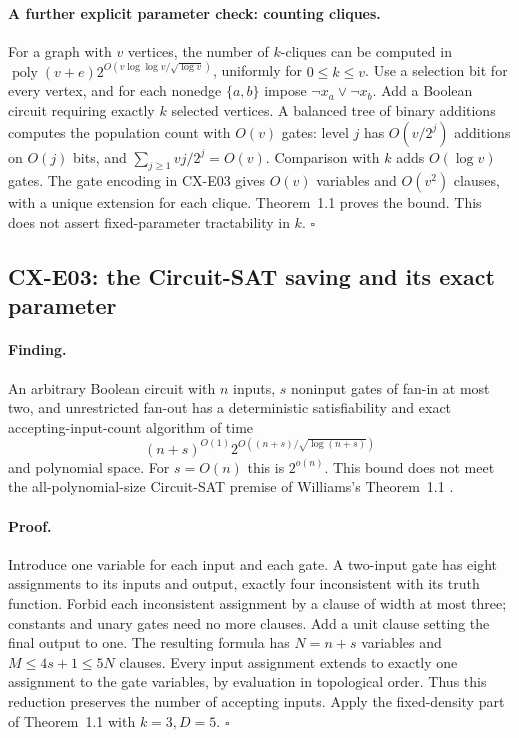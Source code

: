 \paragraph{A further explicit parameter check: counting cliques.}
For a graph with \(v\) vertices, the number of \(k\)-cliques can be
computed in
\(\operatorname{poly}(v+e)
 2^{O(v\log\log v/\sqrt{\log v})}\),
uniformly for \(0\leq k\leq v\).
Use a selection bit for every vertex, and for each nonedge
\(\{a,b\}\) impose \(\neg x_a\vee\neg x_b\).
Add a Boolean circuit requiring exactly \(k\) selected vertices.
A balanced tree of binary additions computes the population count
with \(O(v)\) gates: level \(j\) has \(O(v/2^j)\) additions on
\(O(j)\) bits, and
\(\sum_{j\geq1}vj/2^j=O(v)\).
Comparison with \(k\) adds \(O(\log v)\) gates.
The gate encoding in CX-E03 gives \(O(v)\) variables and \(O(v^2)\)
clauses, with a unique extension for each clique.
Theorem~1.1 proves the bound. This does not assert fixed-parameter
tractability in \(k\).
\hfill\(\square\)

\subsection{CX-E03: the Circuit-SAT saving and its exact parameter}
\label{finding:CX-E03}

\paragraph{Finding.}
An arbitrary Boolean circuit with \(n\) inputs, \(s\) noninput gates
of fan-in at most two, and unrestricted fan-out has a deterministic
satisfiability and exact accepting-input-count algorithm of time
\[
 (n+s)^{O(1)}
 2^{O((n+s)/\sqrt{\log(n+s)})}
\]
and polynomial space.
For \(s=O(n)\) this is \(2^{o(n)}\).
This bound does not meet the all-polynomial-size Circuit-SAT premise
of Williams's Theorem~1.1 \cite[Theorem~1.1]{Williams2013}.

\paragraph{Proof.}
Introduce one variable for each input and each gate.
A two-input gate has eight assignments to its inputs and output,
exactly four inconsistent with its truth function.
Forbid each inconsistent assignment by a clause of width at most
three; constants and unary gates need no more clauses.
Add a unit clause setting the final output to one.
The resulting formula has \(N=n+s\) variables and
\(M\leq4s+1\leq5N\) clauses.
Every input assignment extends to exactly one assignment to the gate
variables, by evaluation in topological order.
Thus this reduction preserves the number of accepting inputs.
Apply the fixed-density part of Theorem~1.1 with \(k=3,D=5\).
\hfill\(\square\)

